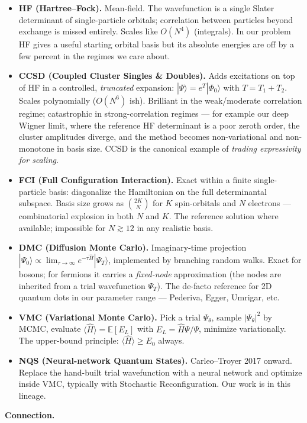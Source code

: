 \documentclass[11pt]{article}
\begin{document}
\begin{itemize}
\item \textbf{HF (Hartree--Fock).} Mean-field. The wavefunction is a single Slater
determinant of single-particle orbitals; correlation between particles
beyond exchange is missed entirely. Scales like $O(N^4)$ (integrals). In
our problem HF gives a useful starting orbital basis but its absolute
energies are off by a few percent in the regimes we care about.
\item \textbf{CCSD (Coupled Cluster Singles \& Doubles).} Adds excitations on top of
HF in a controlled, \emph{truncated} expansion: $|\Psi\rangle = e^T |\Phi_0\rangle$
with $T = T_1 + T_2$. Scales polynomially ($O(N^6)$ ish). Brilliant in the
weak/moderate correlation regime; catastrophic in strong-correlation
regimes --- for example our deep Wigner limit, where the reference HF
determinant is a poor zeroth order, the cluster amplitudes diverge, and
the method becomes non-variational and non-monotone in basis size. CCSD is
the canonical example of \emph{trading expressivity for scaling}.
\item \textbf{FCI (Full Configuration Interaction).} Exact within a finite
single-particle basis: diagonalize the Hamiltonian on the full
determinantal subspace. Basis size grows as $\binom{2K}{N}$ for $K$
spin-orbitals and $N$ electrons --- combinatorial explosion in both $N$ and
$K$. The reference solution where available; impossible for $N \gtrsim
  12$ in any realistic basis.
\item \textbf{DMC (Diffusion Monte Carlo).} Imaginary-time projection
$|\Psi_0\rangle \propto \lim_{\tau\to\infty} e^{-\tau \hat H}|\Psi_T\rangle$,
implemented by branching random walks. Exact for bosons; for fermions it
carries a \emph{fixed-node} approximation (the nodes are inherited from a trial
wavefunction $\Psi_T$). The de-facto reference for 2D quantum dots in our
parameter range --- Pederiva, Egger, Umrigar, etc.
\item \textbf{VMC (Variational Monte Carlo).} Pick a trial $\Psi_\theta$, sample
$|\Psi_\theta|^2$ by MCMC, evaluate $\langle \hat H \rangle = \mathbb
  E[E_L]$ with $E_L = \hat H \Psi / \Psi$, minimize variationally. The
upper-bound principle: $\langle \hat H\rangle \ge E_0$ always.
\item \textbf{NQS (Neural-network Quantum States).} Carleo--Troyer 2017 onward.
Replace the hand-built trial wavefunction with a neural network and
optimize inside VMC, typically with Stochastic Reconfiguration. Our work
is in this lineage.
\end{itemize}
\textbf{Connection.}
\end{document}
